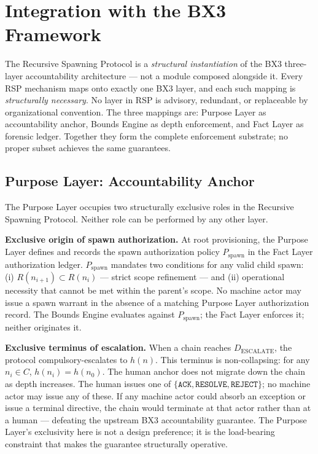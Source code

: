 \section{Integration with the BX3 Framework}
\label{sec:rs-integration}

The Recursive Spawning Protocol is a \emph{structural instantiation} of the BX3 three-layer accountability architecture — not a module composed alongside it. Every RSP mechanism maps onto exactly one BX3 layer, and each such mapping is \emph{structurally necessary}. No layer in RSP is advisory, redundant, or replaceable by organizational convention. The three mappings are: Purpose Layer as accountability anchor, Bounds Engine as depth enforcement, and Fact Layer as forensic ledger. Together they form the complete enforcement substrate; no proper subset achieves the same guarantees.

\subsection{Purpose Layer: Accountability Anchor}
\label{sec:rs-purpose-anchor}

The Purpose Layer occupies two structurally exclusive roles in the Recursive Spawning Protocol. Neither role can be performed by any other layer.

\medskip
\noindent\textbf{Exclusive origin of spawn authorization.} At root provisioning, the Purpose Layer defines and records the spawn authorization policy $P_{\mathrm{spawn}}$ in the Fact Layer authorization ledger. $P_{\mathrm{spawn}}$ mandates two conditions for any valid child spawn: (i) $R(n_{i+1}) \subset R(n_i)$ — strict scope refinement — and (ii) operational necessity that cannot be met within the parent's scope. No machine actor may issue a spawn warrant in the absence of a matching Purpose Layer authorization record. The Bounds Engine evaluates against $P_{\mathrm{spawn}}$; the Fact Layer enforces it; neither originates it.

\medskip
\noindent\textbf{Exclusive terminus of escalation.} When a chain reaches $D_{\mathrm{ESCALATE}}$, the protocol compulsory-escalates to $h(n)$. This terminus is non-collapsing: for any $n_i \in C$, $h(n_i) = h(n_0)$. The human anchor does not migrate down the chain as depth increases. The human issues one of $\{\texttt{ACK}, \texttt{RESOLVE}, \texttt{REJECT}\}$; no machine actor may issue any of these. If any machine actor could absorb an exception or issue a terminal directive, the chain would terminate at that actor rather than at a human — defeating the upstream BX3 accountability guarantee. The Purpose Layer's exclusivity here is not a design preference; it is the load-bearing constraint that makes the guarantee structurally operative.

